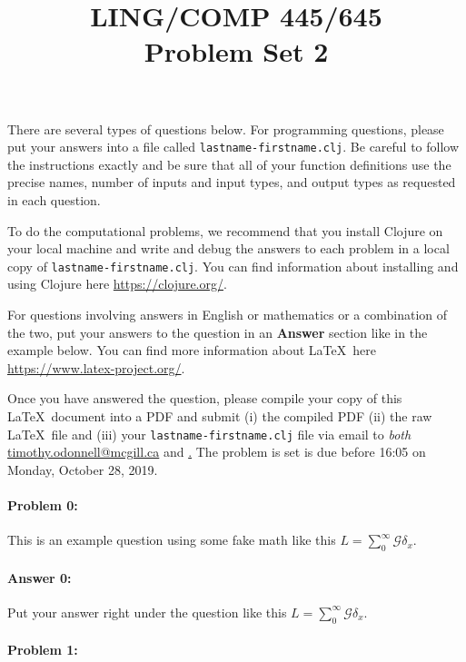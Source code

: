 \documentclass[10pt]{article}
\begin{document}
 
\title{LING/COMP 445/645\\Problem Set 2}
\date{}
\maketitle


There are several types of questions below. For programming questions,
please put your answers into a file called
\texttt{lastname-firstname.clj}. Be careful to follow the instructions
exactly and be sure that all of your function definitions use the
precise names, number of inputs and input types, and output types as
requested in each question.

To do the computational problems, we recommend that you install
Clojure on your local machine and write and debug the answers to each
problem in a local copy of \texttt{lastname-firstname.clj}. You can
find information about installing and using Clojure here
\url{https://clojure.org/}.

For questions involving answers in English or mathematics or a
combination of the two, put your answers to the question in an
\textbf{Answer} section like in the example below. You can find more
information about \LaTeX\ here \url{https://www.latex-project.org/}.

Once you have answered the question, please compile your copy of this
\LaTeX\ document into a PDF and submit (i) the compiled PDF (ii) the
raw \LaTeX\ file and (iii) your \texttt{lastname-firstname.clj} file
via email to \emph{both}
\href{mailto:timothy.odonnell@mcgill.ca}{timothy.odonnell@mcgill.ca}
and
\href{mailto:savanna.willerton@mail.mcgill.ca}\href{savanna.willerton@mail.mcgill.ca}.
The problem is set is due before 16:05 on Monday, October 28, 2019.

\hrulefill
\paragraph{Problem 0:}
This is an example question using some fake math like this
$L=\sum_0^{\infty} \mathcal{G} \delta_x$.

\paragraph{Answer 0:} Put your answer right under the question like
this $L=\sum_0^{\infty} \mathcal{G} \delta_x$.

\hrulefill
\paragraph{Problem 1:}
\end{document}
